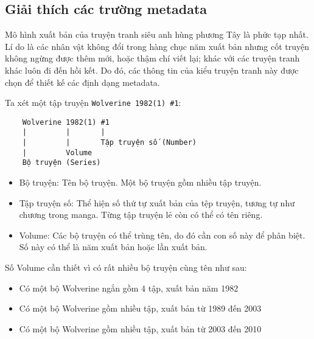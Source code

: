 \documentclass[../../../thesis]{subfiles}
\begin{document}
\begin{appendices}

\appendixpageoff


\chapter{Giải thích các trường metadata}\label{app:metadata}

Mô hình xuất bản của truyện tranh siêu anh hùng phương Tây là phức tạp nhất. Lí
do là các nhân vật không đổi trong hàng chục năm xuất bản nhưng cốt truyện không
ngừng được thêm mới, hoặc thậm chí viết lại; khác với các truyện tranh khác luôn
đi đến hồi kết. Do đó, các thông tin của kiểu truyện tranh này được chọn để
thiết kế các định dạng metadata.

Ta xét một tập truyện \texttt{Wolverine\ 1982(1)\ \#1}:

\begin{verbatim}
    Wolverine 1982(1) #1
    |         |       |
    |         |       Tập truyện số (Number)
    |         Volume
    Bộ truyện (Series)
\end{verbatim}

\begin{itemize}
    \item
        Bộ truyện: Tên bộ truyện. Một bộ truyện gồm nhiều tập truyện.
    \item
        Tập truyện số: Thể hiện số thứ tự xuất bản của tệp truyện, tương tự như
        chương trong manga. Từng tập truyện lẻ còn có thể có tên riêng.
    \item
        Volume: Các bộ truyện có thể trùng tên, do đó cần con số này để phân
        biệt. Số này có thể là năm xuất bản hoặc lần xuất bản.
\end{itemize}

Số Volume cần thiết vì có rất nhiều bộ truyện cùng tên như sau:

\begin{itemize}
    \item
        Có một bộ Wolverine ngắn gồm 4 tập, xuất bản năm 1982
    \item
        Có một bộ Wolverine gồm nhiều tập, xuất bản từ 1989 đến 2003
    \item
        Có một bộ Wolverine gồm nhiều tập, xuất bản từ 2003 đến 2010
\end{itemize}


\end{appendices}
\end{document}
